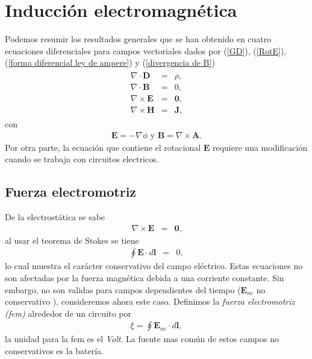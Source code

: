 \chapter{Inducción electromagnética}
Podemos resumir los resultados generales que se han obtenido en cuatro ecuaciones diferenciales para campos vectoriales dados por (\ref{GD}), (\ref{RotE}), (\ref{forma diferencial ley de ampere}) y (\ref{divergencia de B})
\begin{eqnarray}\label{ecs electrostatica}
\begin{split}
\nabla\cdot\textbf{D}&=&\rho,\\
\nabla\cdot\textbf{B}&=&0,\\
\nabla\times\textbf{E}&=&\textbf{0},\\
\nabla\times\textbf{H}&=&\textbf{J},
\end{split}
\end{eqnarray}
con
\begin{eqnarray}
\textbf{E}=-\nabla\phi \,\,\mbox{y}\,\,\textbf{B}=\nabla\times\textbf{A}.\label{PotencialfA}
\end{eqnarray}
Por otra parte, la ecuación que contiene el rotacional $\textbf{E}$ requiere una modificación cuando se trabaja con circuitos electricos.


\section{Fuerza electromotriz}
De la electrostática se sabe
\begin{eqnarray}
\nabla\times\textbf{E}&=&\textbf{0},\nonumber
\end{eqnarray}
al usar el teorema de Stokes se tiene
\begin{eqnarray}
\oint\textbf{E}\cdot d\textbf{l}&=&0,\nonumber
\end{eqnarray}
lo cual muestra el carácter conservativo del campo eléctrico. Estas ecuaciones no son afectadas por la fuerza magnética debida a una corriente constante. Sin embargo, no son validas para campos dependientes del tiempo ($\textbf{E}_{nc}$ no conservativo ), consideremos ahora este caso. Definimos la \emph{fuerza electromotriz (fem)} alrededor de un circuito por
\begin{eqnarray}
\xi=\oint\textbf{E}_{nc}\cdot d\textbf{l},\label{fza electrom}
\end{eqnarray}
la unidad para la fem es el \emph{Volt}. La fuente mas común de estos campos no conservativos es la batería.



